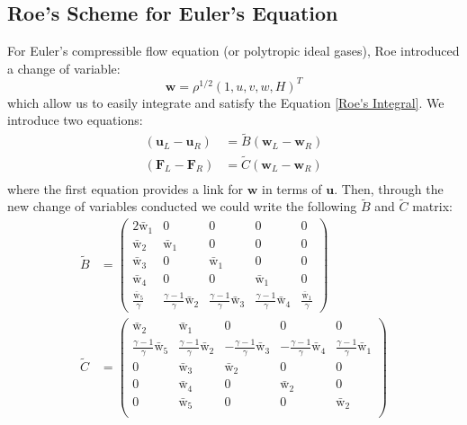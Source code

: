 \documentclass[a4paper]{article}
\numberwithin{equation}{section}
\begin{document}
\subsection{Roe's Scheme for Euler's Equation}
For Euler's compressible flow equation (or polytropic ideal gases), Roe introduced a change of variable:
\begin{equation}
    \mathbf{w} = \rho^{1/2}(1,u,v,w,H)^T
\end{equation}
which allow us to easily integrate and satisfy the Equation \ref{Roe's Integral}. We introduce two equations:
\begin{equation}
    \begin{split}
        \left(\mathbf{u}_L - \mathbf{u}_R\right) &= \tilde{B}(\mathbf{w}_L - \mathbf{w}_R)\\
        \left(\mathbf{F}_L - \mathbf{F}_R\right) &= \tilde{C}(\mathbf{w}_L - \mathbf{w}_R)\\
    \end{split}
\end{equation}
where the first equation provides a link for $\mathbf{w}$ in terms of $\mathbf{u}$. Then, through the new change of variables conducted we could write the following $\tilde{B}$ and $\tilde{C}$ matrix:
\begin{equation}
    \begin{split}
        \tilde{B} &=
        \begin{pmatrix}
            2 \bar{\mathrm{w}}_1 & 0 & 0 & 0 & 0\\
            \bar{\mathrm{w}}_2 & \bar{\mathrm{w}}_1 & 0 & 0 & 0\\
            \bar{\mathrm{w}}_3 & 0 & \bar{\mathrm{w}}_1 & 0 & 0\\
            \bar{\mathrm{w}}_4 & 0 & 0 &\bar{\mathrm{w}}_1 & 0 \\
           \frac{\bar{\mathrm{w}}_5}{\gamma} & \frac{\gamma - 1}{\gamma}\bar{\mathrm{w}}_2 & \frac{\gamma - 1}{\gamma }\bar{\mathrm{w}}_3 & \frac{\gamma - 1}{\gamma} \bar{\mathrm{w}}_4 & \frac{\bar{\mathrm{w}}_1}{\gamma}
        \end{pmatrix} \\
        \tilde{C} &= 
        \begin{pmatrix}
            \bar{\mathrm{w}}_2 & \bar{\mathrm{w}}_1 & 0 & 0 & 0\\
            \frac{\gamma - 1}{\gamma}\bar{\mathrm{w}}_5 & \frac{\gamma - 1}{\gamma}\bar{\mathrm{w}}_2 & -\frac{\gamma - 1}{\gamma}\bar{\mathrm{w}}_3 & -\frac{\gamma - 1}{\gamma} \bar{\mathrm{w}}_4 & \frac{\gamma - 1}{\gamma} \bar{\mathrm{w}}_1\\
            0 & \bar{\mathrm{w}}_3 & \bar{\mathrm{w}}_2 & 0 & 0\\
            0 & \bar{\mathrm{w}}_4 & 0 & \bar{\mathrm{w}}_2 & 0\\
            0 & \bar{\mathrm{w}}_5 & 0 & 0 & \bar{\mathrm{w}}_2\\
        \end{pmatrix}
    \end{split}
\end{equation}
\end{document}
